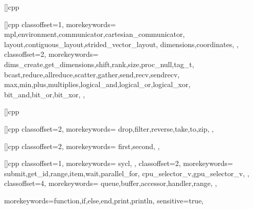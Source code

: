 []{cpp}{
}

[]{cpp}{
  classoffset=1,
  morekeywords={
    mpl,environment,communicator,cartesian_communicator,
    layout,contiguous_layout,strided_vector_layout,
    dimensions,coordinates,
  },
  classoffset=2,
  morekeywords={
    dims_create,get_dimensions,shift,rank,size,proc_null,tag_t,
    bcast,reduce,allreduce,scatter,gather,send,recv,sendrecv,  
    max,min,plus,multiplies,logical_and,logical_or,logical_xor,
    bit_and,bit_or,bit_xor,
  },
}

[]{cpp}{
}

[]{cpp}{
  classoffset=2,
  morekeywords={
    drop,filter,reverse,take,to,zip,
  },
}

[]{cpp}{
  classoffset=2,
  morekeywords={
    first,second,
  },
}

[]{cpp}{
  classoffset=1,
  morekeywords={
    sycl,
  },
  classoffset=2,
  morekeywords={
    submit,get_id,range,item,wait,parallel_for,
    cpu_selector_v,gpu_selector_v,
  },
  classoffset=4,
  morekeywords={
    queue,buffer,accessor,handler,range,
  },
}

                  {morekeywords={function,if,else,end,print,println},
                    sensitive=true,
                  }
                  
